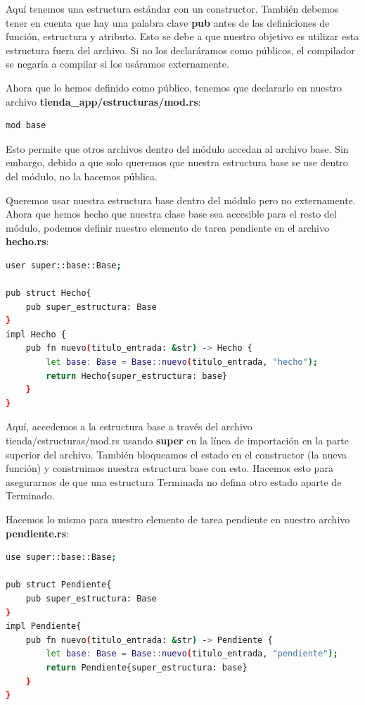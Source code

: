 Aquí tenemos una estructura estándar con un constructor. También debemos tener en cuenta que hay una palabra clave \textbf{pub} antes de las definiciones de función, estructura y atributo. Esto se debe a que nuestro objetivo es utilizar esta estructura fuera del archivo. Si no los declaráramos como públicos, el compilador se negaría a compilar si los usáramos externamente.

Ahora que lo hemos definido como público, tenemos que declararlo en nuestro archivo \textbf{tienda\_app/estructuras/mod.rs}:

\begin{lstlisting}[language=bash]
mod base
\end{lstlisting}

Esto permite que otros archivos dentro del módulo accedan al archivo base. Sin embargo, debido a que solo queremos que nuestra estructura base se use dentro del módulo, no la hacemos pública.

Queremos usar nuestra estructura base dentro del módulo pero no externamente. Ahora que hemos hecho que nuestra clase base sea accesible para el resto del módulo, podemos definir nuestro elemento de tarea pendiente en el archivo \textbf{hecho.rs}:

\begin{lstlisting}[language=bash]
user super::base::Base;

pub struct Hecho{
	pub super_estructura: Base
}
impl Hecho {
	pub fn nuevo(titulo_entrada: &str) -> Hecho {
		let base: Base = Base::nuevo(titulo_entrada, "hecho");
		return Hecho{super_estructura: base}
	}
}
\end{lstlisting}

Aquí, accedemos a la estructura base a través del archivo tienda/estructuras/mod.rs usando \textbf{super} en la línea de importación en la parte superior del archivo. También bloqueamos el estado en el constructor (la nueva función) y construimos nuestra estructura base con esto. Hacemos esto para asegurarnos de que una estructura Terminada no defina otro estado aparte de Terminado.

Hacemos lo mismo para nuestro elemento de tarea pendiente en nuestro archivo \textbf{pendiente.rs}:

\begin{lstlisting}[language=bash]
use super::base::Base;

pub struct Pendiente{
	pub super_estructura: Base
}
impl Pendiente{
	pub fn nuevo(titulo_entrada: &str) -> Pendiente {
		let base: Base = Base::nuevo(titulo_entrada, "pendiente");
		return Pendiente{super_estructura: base}
	}
}
\end{lstlisting}


